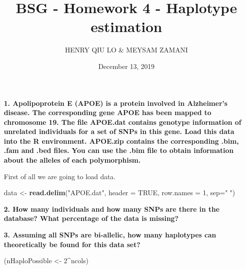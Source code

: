 \documentclass[]{article}
\title{BSG - Homework 4 - Haplotype estimation}
\author{HENRY QIU LO \& MEYSAM ZAMANI}
\date{December 13, 2019}
\newenvironment{Shaded}{\begin{snugshade}}{\end{snugshade}}
\newcommand{\KeywordTok}[1]{\textcolor[rgb]{0.13,0.29,0.53}{\textbf{#1}}}
\newcommand{\DataTypeTok}[1]{\textcolor[rgb]{0.13,0.29,0.53}{#1}}
\newcommand{\DecValTok}[1]{\textcolor[rgb]{0.00,0.00,0.81}{#1}}
\newcommand{\StringTok}[1]{\textcolor[rgb]{0.31,0.60,0.02}{#1}}
\newcommand{\OtherTok}[1]{\textcolor[rgb]{0.56,0.35,0.01}{#1}}
\newcommand{\OperatorTok}[1]{\textcolor[rgb]{0.81,0.36,0.00}{\textbf{#1}}}
\newcommand{\NormalTok}[1]{#1}
\begin{document}
\maketitle

\textbf{1. Apolipoprotein E (APOE) is a protein involved in Alzheimer's
disease. The corresponding gene APOE has been mapped to chromosome 19.
The file APOE.dat contains genotype information of unrelated individuals
for a set of SNPs in this gene. Load this data into the R environment.
APOE.zip contains the corresponding .bim, .fam and .bed files. You can
use the .bim file to obtain information about the alleles of each
polymorphism.}

First of all we are going to load data.

\begin{Shaded}
\begin{Highlighting}[]
\NormalTok{data <-}\StringTok{ }\KeywordTok{read.delim}\NormalTok{(}\StringTok{"APOE.dat"}\NormalTok{, }\DataTypeTok{header =} \OtherTok{TRUE}\NormalTok{, }\DataTypeTok{row.names =} \DecValTok{1}\NormalTok{, }\DataTypeTok{sep=}\StringTok{" "}\NormalTok{)}
\end{Highlighting}
\end{Shaded}

\textbf{2. How many individuals and how many SNPs are there in the
database? What percentage of the data is missing?}

\begin{Shaded}
\end{Shaded}

\textbf{3. Assuming all SNPs are bi-allelic, how many haplotypes can
theoretically be found for this data set?}

\begin{Shaded}
\begin{Highlighting}[]
\NormalTok{(nHaploPossible <-}\StringTok{ }\DecValTok{2}\OperatorTok{^}\NormalTok{ncols)}
\end{Highlighting}
\end{Shaded}
\end{document}
